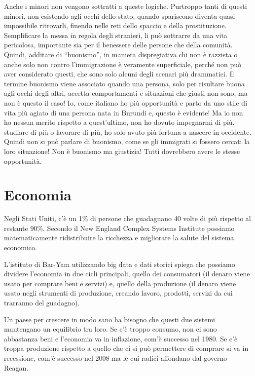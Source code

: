 \documentclass[12pt]{book} %
\begin{document}
\bigskip

Anche i minori non vengono sottratti a queste logiche. Purtroppo tanti di questi minori, non esistendo agli occhi dello
stato, quando spariscono diventa quasi impossibile ritrovarli, finendo nelle reti dello spaccio e della prostituzione.
Semplificare la messa in regola degli stranieri, li può sottrarre da una vita pericolosa, importante sia per il
benessere delle persone che della comunità. Quindi, additare di “buonismo”, in maniera dispregiativa chi non è razzista
o anche solo non contro l'immigrazione è veramente superficiale, perché non può aver considerato
questi, che sono solo alcuni degli scenari più drammatici. Il termine buonismo viene associato quando una persona, solo
per risultare buona agli occhi degli altri, accetta comportamenti e situazioni che giusti non sono, ma non è questo il
caso! Io, come italiano ho più opportunità e parto da uno stile di vita più agiato di una persona nata in Burundi e,
questo è evidente! Ma io non ho nessun merito rispetto a quest'ultimo, non ho dovuto impegnarmi di
più, studiare di più o lavorare di più, ho solo avuto più fortuna a nascere in occidente. Quindi non si può parlare di
buonismo, come se gli immigrati si fossero cercati la loro situazione! Non è buonismo ma giustizia! Tutti dovrebbero
avere le stesse opportunità.

\clearpage\section{Economia}
Negli Stati Uniti, c'è un 1\% di persone che guadagnano 40 volte di più rispetto al restante
90\%. Secondo il New England Complex Systems Institute
possiamo matematicamente ridistribuire la ricchezza e
migliorare la salute del sistema economico.

L'istituto di Bar-Yam utilizzando big data e dati storici spiega che possiamo dividere l'economia
in due cicli principali, quello dei consumatori (il denaro viene usato per comprare beni e servizi) e, quello della
produzione (il denaro viene usato negli strumenti di produzione, creando lavoro, prodotti, servizi da cui trarranno del
guadagno).

Un paese per crescere in modo sano ha bisogno che questi due sistemi mantengano un equilibrio tra loro. Se
c'è troppo consumo, non ci sono abbastanza beni e l'economia va in inflazione,
com'è successo nel 1980.
Se c'è troppa produzione rispetto a quello che ci si può permettere di comprare si va in
recessione, com'è successo nel 2008 ma le cui radici affondano dal governo
Reagan.
\end{document}
